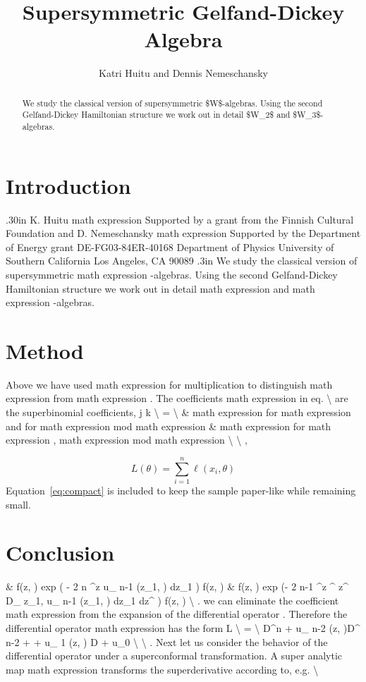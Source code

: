 \documentclass[11pt]{article}
\title{Supersymmetric Gelfand-Dickey Algebra}
\author{Katri Huitu and Dennis Nemeschansky}
\date{}
\begin{document}
\maketitle
\begin{abstract}

We study the classical version of supersymmetric \$W\$-algebras. Using the second Gelfand-Dickey Hamiltonian structure we work out in detail \$W\_2\$ and \$W\_3\$-algebras.

\end{abstract}

\section{Introduction}

.30in K. Huitu math expression Supported by a grant from the Finnish Cultural Foundation and D. Nemeschansky math expression Supported by the Department of Energy grant DE-FG03-84ER-40168 Department of Physics University of Southern California Los Angeles, CA 90089 .3in We study the classical version of supersymmetric math expression -algebras. Using the second Gelfand-Dickey Hamiltonian structure we work out in detail math expression and math expression -algebras.

\section{Method}

Above we have used math expression for multiplication to distinguish math expression from math expression . The coefficients math expression in eq. \textbackslash{} are the superbinomial coefficients, j k \textbackslash{} = \textbackslash{} \& math expression for math expression and for math expression mod math expression \& math expression for math expression , math expression mod math expression \textbackslash{} \textbackslash{} ,

\begin{equation}
\label{eq:compact}
L(\theta) = \sum_{i=1}^{n} \ell(x_i, \theta)
\end{equation}
Equation~\ref{eq:compact} is included to keep the sample paper-like while remaining small.

\section{Conclusion}

\& f(z, ) exp ( - 2 n \textasciicircum{}z u\_ n-1 (z\_1, ) dz\_1 ) f(z, ) \& f(z, ) exp (- 2 n-1 \textasciicircum{}z \textasciicircum{} z\textasciicircum{} D\_ z\_1, u\_ n-1 (z\_1, ) dz\_1 dz\textasciicircum{} ) f(z, ) \textbackslash{} . we can eliminate the coefficient math expression from the expansion of the differential operator . Therefore the differential operator math expression has the form L \textbackslash{} = \textbackslash{} D\textasciicircum{}n + u\_ n-2 (z, )D\textasciicircum{} n-2 + + u\_ 1 (z, ) D + u\_0 \textbackslash{} \textbackslash{} . Next let us consider the behavior of the differential operator under a superconformal transformation. A super analytic map math expression transforms the superderivative according to, e.g. \textbackslash{}
\end{document}

